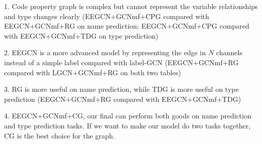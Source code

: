 %			

1. Code property graph is complex but cannot represent the variable relationships and type changes clearly (EEGCN+GCNmf+CPG compared with EEGCN+GCNmf+RG on name prediction; EEGCN+GCNmf+CPG compared with EEGCN+GCNmf+TDG on type prediction)

2. EEGCN is a more advanced model by representing the edge in $N$ channels instead of a simple label compared with label-GCN (EEGCN+GCNmf+RG compared with LGCN+GCNmf+RG on both two tables)

3. RG is more useful on name prediction, while TDG is more useful on type prediction (EEGCN+GCNmf+RG compared with EEGCN+GCNmf+TDG)

4. EEGCN+GCNmf+CG, our final {\tool} can perform both goods on name prediction and type prediction tasks. If we want to make our model do two tasks together, CG is the best choice for the graph.
